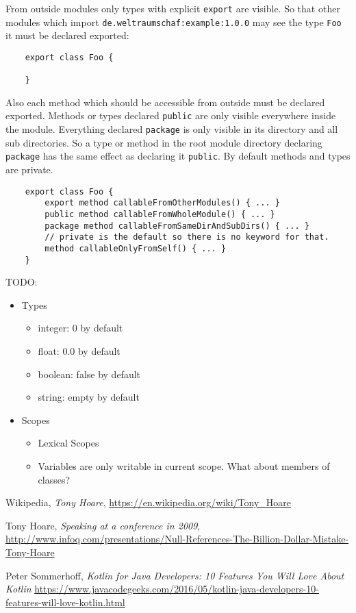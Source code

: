 \documentclass[a4paper,12pt]{article}
\begin{document}
From outside modules only types with explicit \verb|export| are visible. So that other modules which import \verb|de.weltraumschaf:example:1.0.0| may see the type \verb|Foo| it must be declared exported:
\begin{verbatim}
	export class Foo {
	
	}
\end{verbatim}

Also each method which should be accessible from outside must be declared exported. Methods or types declared \verb|public| are only visible everywhere inside the module. Everything declared \verb|package| is only visible in its directory and all sub directories. So a type or method in the root module directory declaring \verb|package| has the same effect as declaring it \verb|public|. By default methods and types are private.

\begin{verbatim}
	export class Foo {
	    export method callableFromOtherModules() { ... }
	    public method callableFromWholeModule() { ... }
	    package method callableFromSameDirAndSubDirs() { ... }
	    // private is the default so there is no keyword for that.
	    method callableOnlyFromSelf() { ... }
	}
\end{verbatim}

TODO:

\begin{itemize}
	\item Types
  	\begin{itemize}
  		\item integer: 0 by default
  		\item float: 0.0 by default
  		\item boolean: false by default
  		\item string: empty by default
  	\end{itemize} 
  	\item Scopes
  	\begin{itemize}
  		\item Lexical Scopes
  		\item Variables are only writable in current scope. What about members of classes?
  	\end{itemize}
\end{itemize}

\newpage
\begin{thebibliography}{56}
	Wikipedia,
	\emph{Tony Hoare},
	\url{https://en.wikipedia.org/wiki/Tony_Hoare}
	
	Tony Hoare,
	\emph{Speaking at a conference in 2009},
	\url{http://www.infoq.com/presentations/Null-References-The-Billion-Dollar-Mistake-Tony-Hoare}
	
 	Peter Sommerhoff,
 	\emph{Kotlin for Java Developers: 10 Features You Will Love About Kotlin}
 	\url{https://www.javacodegeeks.com/2016/05/kotlin-java-developers-10-features-will-love-kotlin.html}
\end{thebibliography}
\end{document}
